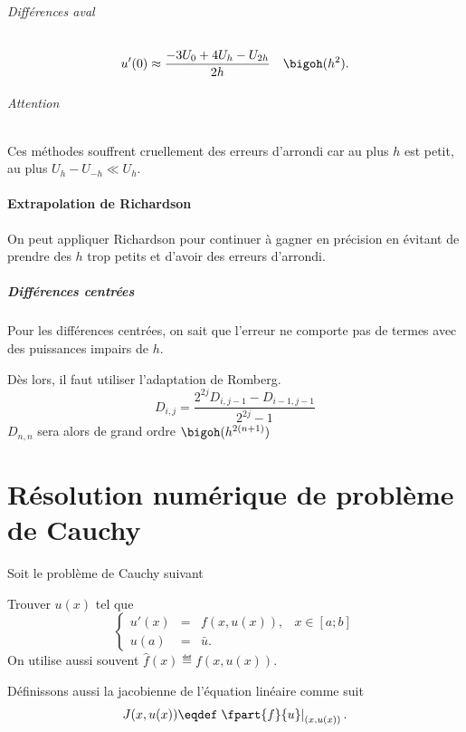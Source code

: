 \paragraph{Différences aval}
\begin{align*}
  u'(0) & \approx \frac{-3U_0 + 4U_{h} - U_{2h}}{2h} & \bigoh(h^2).
\end{align*}

\paragraph{Attention}
Ces méthodes souffrent cruellement des erreurs d'arrondi
car au plus $h$ est petit, au plus $U_h - U_{-h} \ll U_h$.

\subsection{Extrapolation de Richardson}
On peut appliquer Richardson pour continuer à gagner en précision
en évitant de prendre des $h$ trop petits et d'avoir des erreurs d'arrondi.

\subsubsection{Différences centrées}
Pour les différences centrées, on sait que l'erreur ne comporte
pas de termes avec des puissances impairs de $h$.

Dès lors, il faut utiliser l'adaptation de Romberg.
\[ D_{i, j} = \frac{2^{2j}D_{i,j-1} - D_{i-1,j-1}}{2^{2j}-1} \]
$D_{n, n}$ sera alors de grand ordre $\bigoh(h^{2(n+1)})$

\part{Résolution numérique de problème de Cauchy}
Soit le problème de Cauchy suivant

Trouver $u(x)$ tel que
\[ \left\{ \begin{array}{rclr}
    u'(x) & = & f(x,u(x)), & x \in [a;b]\\
    u(a) & = & \bar{u}.
\end{array} \right. \]
On utilise aussi souvent $\hat{f}(x) \eqdef f(x, u(x))$.

Définissons aussi la jacobienne de l'équation linéaire comme suit
\[ J(x, u(x)) \eqdef \left.\fpart{f}{u}\right|_{(x,u(x))}. \]


